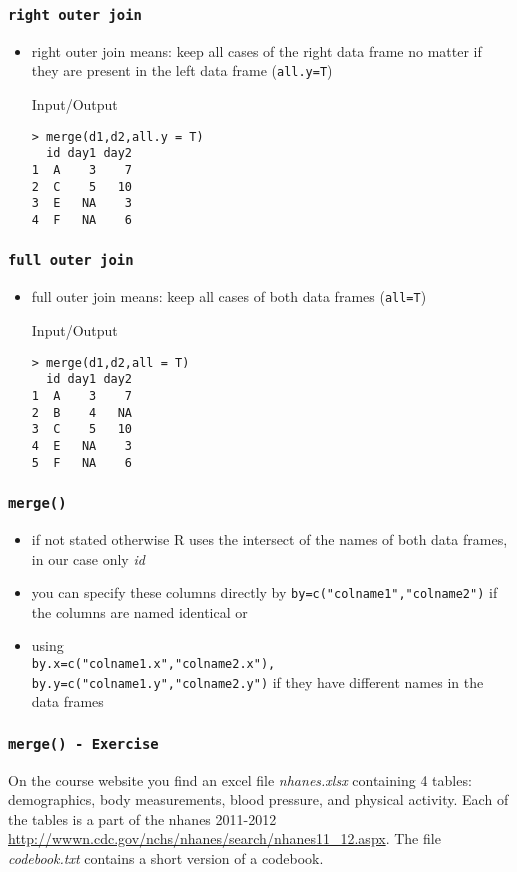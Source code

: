 \begin{frame}[fragile]\frametitle{\texttt{right outer join}}
\begin{itemize}
\item right outer join means: keep all cases of the right data frame no matter if they are present in the left data frame (\texttt{all.y=T})
  \begin{exampleblock}{Input/Output}\small
\begin{verbatim}
> merge(d1,d2,all.y = T)
  id day1 day2
1  A    3    7
2  C    5   10
3  E   NA    3
4  F   NA    6
\end{verbatim}
  \end{exampleblock}
\end{itemize}
\end{frame}


\begin{frame}[fragile]\frametitle{\texttt{full outer join}}
\begin{itemize}
\item full outer join means: keep all cases of both data frames (\texttt{all=T})
  \begin{exampleblock}{Input/Output}\small
\begin{verbatim}
> merge(d1,d2,all = T)
  id day1 day2
1  A    3    7
2  B    4   NA
3  C    5   10
4  E   NA    3
5  F   NA    6
\end{verbatim}
  \end{exampleblock}
\end{itemize}
\end{frame}

\begin{frame}[fragile]\frametitle{\texttt{merge()}}
\begin{itemize}
\item if not stated otherwise R uses the intersect of the names of both data frames, in our case only \textit{id}
\item you can specify these columns directly by \texttt{by=c("colname1","colname2")} if the columns are named identical or
\item using\\ \texttt{by.x=c("colname1.x","colname2.x"),
by.y=c("colname1.y","colname2.y")} if they have different names in the data frames
\end{itemize}
\end{frame}

\begin{frame}\frametitle{\texttt{merge() - Exercise}}
On the course website you find an excel file \emph{nhanes.xlsx} containing 4 tables: demographics, body measurements, blood pressure, and physical activity. Each of the tables is a part of the nhanes 2011-2012 \url{http://wwwn.cdc.gov/nchs/nhanes/search/nhanes11_12.aspx}. The file \emph{codebook.txt} contains a short version of a codebook.
\end{frame}

